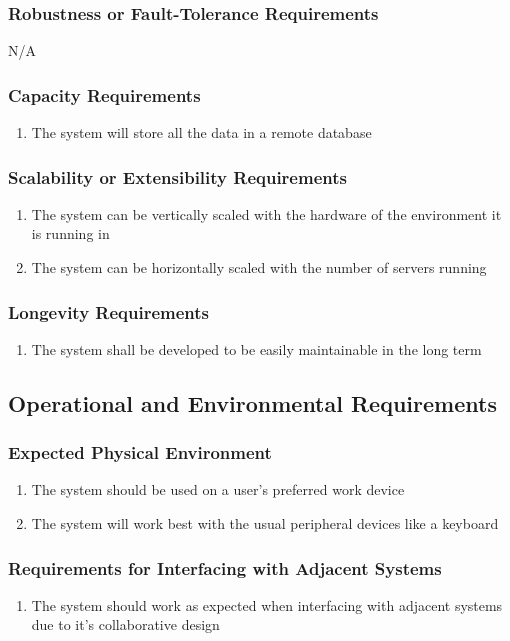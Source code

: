\documentclass[12pt, titlepage]{article}
\begin{document}
	\subsubsection{Robustness or Fault-Tolerance Requirements}
	N/A
	\subsubsection{Capacity Requirements}
	\begin{enumerate}[resume*]
		\item The system will store all the data in a remote database
	\end{enumerate}
	\subsubsection{Scalability or Extensibility Requirements}
	\begin{enumerate}[resume*]
		\item The system can be vertically scaled with the hardware of the environment it is running in
		\item The system can be horizontally scaled with the number of servers running
	\end{enumerate}
	\subsubsection{Longevity Requirements}
	\begin{enumerate}[resume*]
		\item The system shall be developed to be easily maintainable in the long term
	\end{enumerate}
	\subsection{Operational and Environmental Requirements}
	\subsubsection{Expected Physical Environment}
	\begin{enumerate}[resume*]
		\item The system should be used on a user's preferred work device
		\item The system will work best with the usual peripheral devices like a keyboard
	\end{enumerate}
	\subsubsection{Requirements for Interfacing with Adjacent Systems}
	\begin{enumerate}[resume*]
		\item The system should work as expected when interfacing with adjacent systems due to it's collaborative design 
	\end{enumerate}
\end{document}
